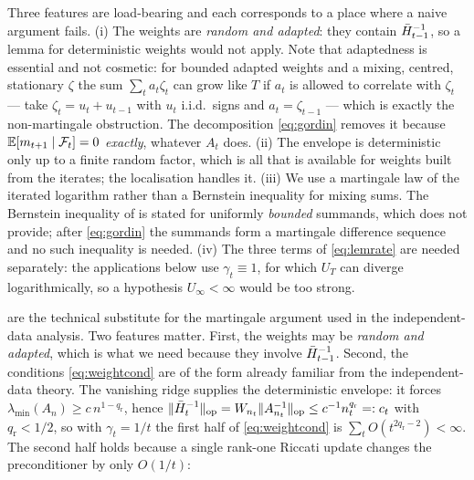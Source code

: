 \begin{remark}
Three features are load-bearing and each corresponds to a place where a naive argument fails.
(i) The weights are \emph{random and adapted}: they contain $\bar{H}_{t-1}^{-1}$, so a lemma for
deterministic weights would not apply. Note that adaptedness is essential and not cosmetic:
for bounded adapted weights and a mixing, centred, stationary $\zeta$ the sum
$\sum_ta_t\zeta_t$ can grow like $T$ if $a_t$ is allowed to correlate with $\zeta_t$ --- take
$\zeta_t=u_t+u_{t-1}$ with $u_t$ i.i.d.\ signs and $a_t=\zeta_{t-1}$ --- which is exactly the
non-martingale obstruction. The decomposition \eqref{eq:gordin} removes it because
$\mathbb{E}[m_{t+1}\mid\mathcal{F}_t]=0$ \emph{exactly}, whatever $A_t$ does.
(ii) The envelope is deterministic only up to a finite random factor, which is all that is
available for weights built from the iterates; the localisation handles it.
(iii) We use a martingale law of the iterated logarithm rather than a Bernstein inequality for
mixing sums. The Bernstein inequality of \citet{merlevede2011bernstein} is stated for
uniformly \emph{bounded} summands, which  does not provide; after
\eqref{eq:gordin} the summands form a martingale difference sequence and no such inequality
is needed. (iv) The three terms of \eqref{eq:lemrate} are needed separately: the applications
below use $\gamma_t\equiv1$, for which $U_T$ can diverge logarithmically, so a hypothesis
$U_\infty<\infty$ would be too strong.
\end{remark}

 are the technical substitute for the martingale argument used
in the independent-data analysis. Two features matter. First, the weights may be
\emph{random and adapted}, which is what we need because they involve $\bar{H}_{t-1}^{-1}$.
Second, the conditions \eqref{eq:weightcond} are of the form already familiar from the
independent-data theory. The vanishing ridge supplies the deterministic envelope: it forces
$\lambda_{\min}(A_{n})\ge c\,n^{1-q_{\mathrm r}}$, hence
$\lVert \bar{H}_t^{-1} \rVert_{\mathrm{op}}=W_{n_t}\lVert A_{n_t}^{-1} \rVert_{\mathrm{op}}\le c^{-1}n_t^{q_{\mathrm r}}=:c_t$ with
$q_{\mathrm r}<1/2$, so with $\gamma_t=1/t$ the first half of \eqref{eq:weightcond} is
$\sum_tO(t^{2q_{\mathrm r}-2})<\infty$. The second half holds because a single rank-one Riccati
update changes the preconditioner by only $O(1/t)$:

